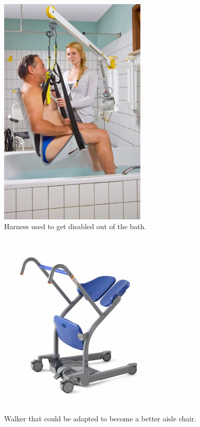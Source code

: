 \begin{figure}[h]
  \centering
     \includegraphics[width=7cm]{images/harness.jpg}
   \caption{Harness used to get disabled out of the bath. \cite{harness}}%
  \label{fig:harness.jpg}
\end{figure} 

\begin{figure}[h]
  \centering
     \includegraphics[width=7cm]{images/walker.jpg}
   \caption{Walker that could be adapted to become a better aisle chair. \cite{walker}}%
  \label{fig:walker.jpg}
\end{figure} 

